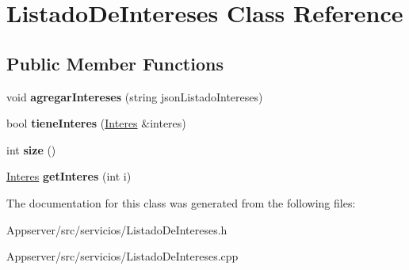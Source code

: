 \hypertarget{classListadoDeIntereses}{}\section{Listado\+De\+Intereses Class Reference}
\label{classListadoDeIntereses}
\subsection*{Public Member Functions}
\begin{DoxyCompactItemize}
\item 
void {\bfseries agregar\+Intereses} (string json\+Listado\+Intereses)\hypertarget{classListadoDeIntereses_a148967d35fc5714b1a8158dc60cd80a8}{}\label{classListadoDeIntereses_a148967d35fc5714b1a8158dc60cd80a8}

\item 
bool {\bfseries tiene\+Interes} (\hyperlink{classInteres}{Interes} \&interes)\hypertarget{classListadoDeIntereses_aa7178e2b423992b423f1d1196ea819dc}{}\label{classListadoDeIntereses_aa7178e2b423992b423f1d1196ea819dc}

\item 
int {\bfseries size} ()\hypertarget{classListadoDeIntereses_a9dd88a649eb2b2f65bdd3e65e2fc47b4}{}\label{classListadoDeIntereses_a9dd88a649eb2b2f65bdd3e65e2fc47b4}

\item 
\hyperlink{classInteres}{Interes} {\bfseries get\+Interes} (int i)\hypertarget{classListadoDeIntereses_aab8af1012932dcd636b547d11ef87213}{}\label{classListadoDeIntereses_aab8af1012932dcd636b547d11ef87213}

\end{DoxyCompactItemize}


The documentation for this class was generated from the following files\+:\begin{DoxyCompactItemize}
\item 
Appserver/src/servicios/Listado\+De\+Intereses.\+h\item 
Appserver/src/servicios/Listado\+De\+Intereses.\+cpp\end{DoxyCompactItemize}
